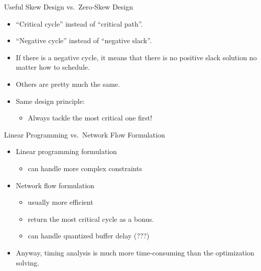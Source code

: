 \documentclass[10pt,ignorenonframetext,mathserif,onlymath]{beamer}
\providecommand{\tightlist}{%
  \setlength{\itemsep}{0pt}\setlength{\parskip}{0pt}}
\begin{document}
\begin{frame}{Useful Skew Design vs.~Zero-Skew Design}
\protect\hypertarget{useful-skew-design-vs.zero-skew-design}{}

\begin{itemize}
\tightlist
\item
  “Critical cycle” instead of “critical path”.
\item
  “Negative cycle” instead of “negative slack”.
\item
  If there is a negative cycle, it means that there is no positive slack
  solution no matter how to schedule.
\item
  Others are pretty much the same.
\item
  Same design principle:

  \begin{itemize}
  \tightlist
  \item
    Always tackle the most critical one first!
  \end{itemize}
\end{itemize}

\end{frame}

\begin{frame}{Linear Programming vs.~Network Flow Formulation}
\protect\hypertarget{linear-programming-vs.network-flow-formulation}{}

\begin{itemize}
\tightlist
\item
  Linear programming formulation

  \begin{itemize}
  \tightlist
  \item
    can handle more complex constraints
  \end{itemize}
\item
  Network flow formulation

  \begin{itemize}
  \tightlist
  \item
    usually more efficient
  \item
    return the most critical cycle as a bonus.
  \item
    can handle quantized buffer delay (???)
  \end{itemize}
\item
  Anyway, timing analysis is much more time-consuming than the
  optimization solving.
\end{itemize}

\end{frame}
\end{document}
